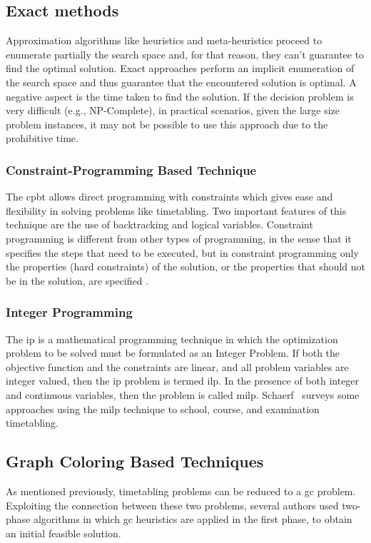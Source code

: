 \subsection{Exact methods}
\label{subsec:ExactMethods}
Approximation algorithms like heuristics and meta-heuristics proceed to enumerate partially the search space and, for that reason, they can't guarantee to find the optimal solution. Exact approaches perform an implicit enumeration of the search space and thus guarantee that the encountered solution is optimal. A negative aspect is the time taken to find the solution. If the decision problem is very difficult (e.g., NP-Complete), in practical scenarios, given the large size problem instances, it may not be possible to use this approach due to the prohibitive time.\\

\subsubsection{Constraint-Programming Based Technique}
The \gls{cpbt} \cite{Boizumault1996} allows direct programming with constraints which gives ease and flexibility in solving problems like timetabling. Two important features of this technique are the use of backtracking and logical variables. Constraint programming is different from other types of programming, in the sense that it specifies the steps that need to be executed, but in constraint programming only the properties (hard constraints) of the solution, or the properties that should not be in the solution, are specified \cite{Qu2009}.\\

\subsubsection{Integer Programming}
The \gls{ip} \cite{Al-Yakoob2010} is a mathematical programming technique in which the optimization problem to be solved must be formulated as an Integer Problem. If both the objective function and the constraints are linear, and all problem variables are integer valued, then the \gls{ip} problem is termed \gls{ilp}. In the presence of both integer and continuous variables, then the problem is called \gls{milp}. Schaerf~\cite{Schaerf1999} surveys some approaches using the \gls{milp} technique to school, course, and examination timetabling.\\

\subsection{Graph Coloring Based Techniques}
\label{subsec:GraphColoring}
As mentioned previously, timetabling problems can be reduced to a \gls{gc} problem. Exploiting the connection between these two problems, several authors used two-phase algorithms in which \gls{gc} heuristics are applied in the first phase, to obtain an initial feasible solution.\\

